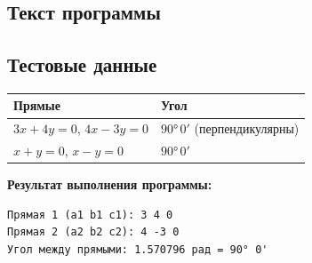 \subsection{Текст программы}



\subsection{Тестовые данные}

\begin{center}
\begin{tabular}{l|l}
\toprule
Прямые & Угол \\
\midrule
$3x+4y=0$, $4x-3y=0$ & $90°\,0'$ (перпендикулярны) \\
$x+y=0$, $x-y=0$ & $90°\,0'$ \\
\bottomrule
\end{tabular}
\end{center}

\textbf{Результат выполнения программы:}
\begin{lstlisting}[language={},basicstyle=\ttfamily\small,frame=single]
Прямая 1 (a1 b1 c1): 3 4 0
Прямая 2 (a2 b2 c2): 4 -3 0
Угол между прямыми: 1.570796 рад = 90° 0'
\end{lstlisting}
